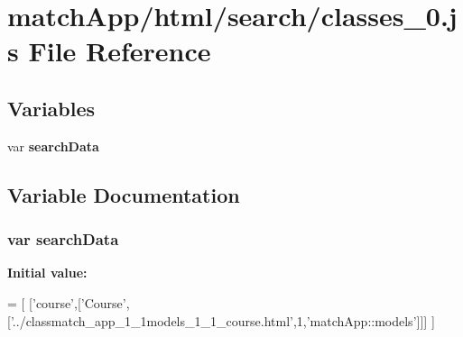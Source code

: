 \section{match\+App/html/search/classes\+\_\+0.js File Reference}
\label{classes__0_8js}
\subsection*{Variables}
\begin{DoxyCompactItemize}
\item 
var {\bf search\+Data}
\end{DoxyCompactItemize}


\subsection{Variable Documentation}
\subsubsection[{search\+Data}]{\setlength{\rightskip}{0pt plus 5cm}var search\+Data}\label{classes__0_8js_ad01a7523f103d6242ef9b0451861231e}
{\bfseries Initial value\+:}
\begin{DoxyCode}
=
[
  [\textcolor{stringliteral}{'course'},[\textcolor{stringliteral}{'Course'},[\textcolor{stringliteral}{'../classmatch\_app\_1\_1models\_1\_1\_course.html'},1,\textcolor{stringliteral}{'matchApp::models'}]]]
]
\end{DoxyCode}
